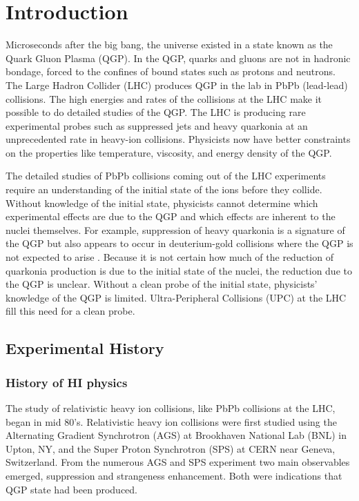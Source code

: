 \chapter{Introduction}
  Microseconds after the big bang, the universe existed in a state known as
    the Quark Gluon Plasma (QGP).
  In the QGP, quarks and gluons are not in hadronic bondage, forced to 
    the confines of bound states such as protons and neutrons.
  The Large Hadron Collider (LHC) produces QGP in the lab in PbPb (lead-lead)
    collisions.
  The high energies and rates of the collisions at the LHC make it possible 
    to do detailed studies of the QGP. 
  The LHC is producing rare experimental probes such as suppressed jets and 
    heavy quarkonia at an unprecedented rate in heavy-ion collisions. 
  Physicists now have better constraints on the properties like temperature,
    viscosity, and energy density of the QGP.

  The detailed studies of PbPb collisions coming out of the LHC 
    experiments require an understanding of the initial state of the ions 
    before they collide.
  Without knowledge of the initial state, physicists cannot determine which
    experimental effects are due to the QGP and which effects are inherent to
    the nuclei themselves. 
  For example, suppression of heavy quarkonia is a signature of the QGP 
    but also appears to occur in deuterium-gold collisions where the QGP is not
    expected to arise \cite{dAuOniaPHENIX}. 
  Because it is not certain how much of the reduction of quarkonia production
    is due to the initial state of the nuclei, the reduction due to the QGP
    is unclear. 
  Without a clean probe of the initial state, physicists' knowledge of the 
    QGP is limited.
  Ultra-Peripheral Collisions (UPC) at the LHC fill this need for a clean 
    probe.

  \section{Experimental History}
    \subsection{History of HI physics}
      The study of relativistic heavy ion collisions, like PbPb collisions at 
        the LHC, began in mid 80's.
      Relativistic heavy ion collisions were first studied using the 
        Alternating Gradient Synchrotron (AGS) at Brookhaven National Lab (BNL) 
        in Upton, NY, and the Super Proton Synchrotron (SPS) at CERN near 
        Geneva, Switzerland. 
      From the numerous AGS and SPS experiment two main observables emerged,
        \JPsi{} suppression and strangeness enhancement. 
      Both were indications that QGP state had been produced. 

